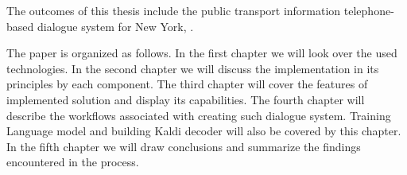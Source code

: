 The outcomes of this thesis include the public transport information telephone-based dialogue system for New York, .

The paper is organized as follows.
In the first chapter we will look over the used technologies.
In the second chapter we will discuss the implementation in its principles by each component. %
The third chapter will cover the features of implemented solution and display its capabilities.
The fourth chapter will describe the workflows associated with creating such dialogue system.
Training Language model and building Kaldi decoder will also be covered by this chapter.
In the fifth chapter we will draw conclusions and summarize the findings encountered in the process.
















